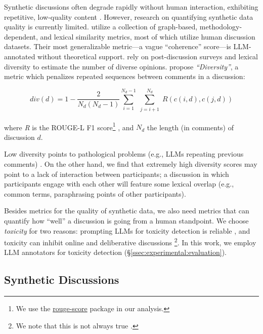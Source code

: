 Synthetic discussions often degrade rapidly without human interaction, exhibiting repetitive, low-quality content \citep{ulmer2024}. However, research on quantifying synthetic data quality is currently limited. \citet{balog_2024} utilize a collection of graph-based, methodology-dependent, and lexical similarity metrics, most of which utilize human discussion datasets. Their most generalizable metric—a vague ``coherence'' score—is \ac{LLM}-annotated without theoretical support. \citet{kim_et_al_chatbot} rely on post-discussion surveys and lexical diversity to estimate the number of diverse opinions. \citet{ulmer2024} propose \emph{``Diversity''}, a metric which penalizes repeated sequences between comments in a discussion:

\small
\begin{equation}
\label{eq:variety}
    \textit{div}(d) = 1 - \frac{2}{N_d(N_d-1)}
\sum_{i=1}^{N_d-1} \sum_{\substack{j=i+1}}^{N_d} R(c(i,d), c(j,d))
\end{equation}
\normalsize

\noindent where \textit{R} is the ROUGE-L F1 score\footnote{We use the \href{https://pypi.org/project/rouge-score}{rouge-score} package in our analysis.} \cite{lin-2004-rouge}, and $N_d$ the length (in comments) of discussion $d$.

Low diversity points to pathological problems (e.g., \acp{LLM} repeating previous comments) \cite{ulmer2024}. On the other hand, we find that extremely high diversity scores may point to a lack of interaction between participants; a discussion in which participants engage with each other will feature some lexical overlap (e.g., common terms, paraphrasing points of other participants).

Besides metrics for the quality of synthetic data, we also need metrics that can quantify how ``well'' a discussion is going from a human standpoint. We choose \emph{toxicity} for two reasons: prompting \acp{LLM} for toxicity detection is reliable \citep{kang-qian-2024-implanting, Wang2022ToxicityDW, anjum2024hate}, and toxicity can inhibit online and deliberative discussions \citep{dekock2022disagree, XiaToxicity}\footnote{We note that this is not always true \citep{Avalle2024PersistentIP}.}. In this work, we employ \ac{LLM} annotators for toxicity detection (\S\ref{ssec:experimental:evaluation}).


\subsection{Synthetic Discussions}
\label{ssec:related:discussions}

